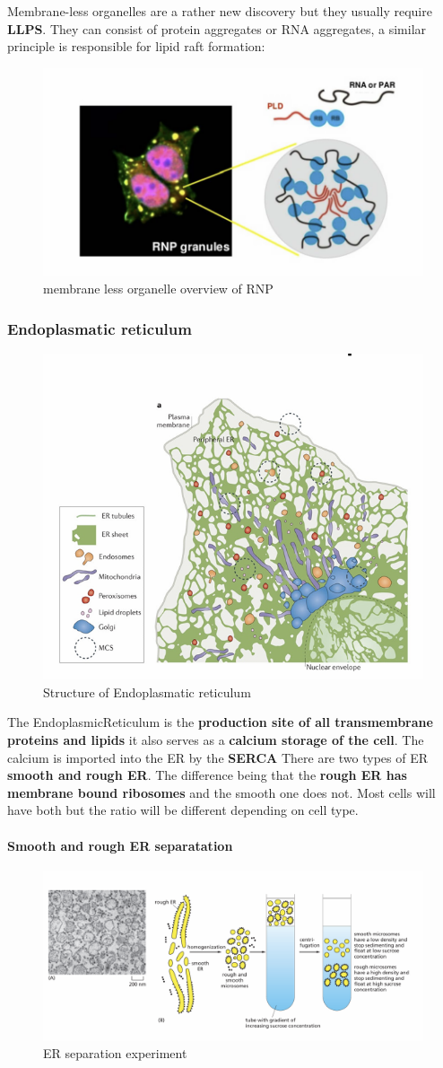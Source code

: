 \documentclass[../main.tex]{subfiles}
\begin{document}
Membrane-less organelles are a rather new discovery but they usually require \textbf{\gls{LLPS}}. They can consist of protein aggregates or RNA aggregates, a similar principle is responsible for lipid raft formation:
\begin{figure}[H]
    \centering
    \includegraphics[width=0.5\linewidth]{RNP.png}
    \caption{membrane less organelle overview of \gls{RNP} }
    \label{fig:enter-label}
\end{figure}


\subsubsection{Endoplasmatic reticulum}
\begin{figure}[H]
    \centering
    \includegraphics[width=0.5\linewidth]{ER.png}
    \caption{Structure of Endoplasmatic reticulum}
    \label{fig:enter-label}
\end{figure}
The \gls{EndoplasmicReticulum} is the \textbf{production site of all transmembrane proteins and lipids } it also serves as a \textbf{calcium storage of the cell}. The calcium is imported into the ER by the \textbf{\gls{SERCA}} There are two types of ER \textbf{smooth and rough ER}. The difference being that the \textbf{rough ER has membrane bound ribosomes} and the smooth one does not. Most cells will have both but the ratio will be different depending on cell type.

\paragraph{Smooth and rough ER separatation}
\begin{figure}[H]
    \centering
    \includegraphics[width=0.5\linewidth]{ERSeparation.png}
    \caption{ER separation experiment}
    \label{fig:enter-label}
\end{figure}
\end{document}
